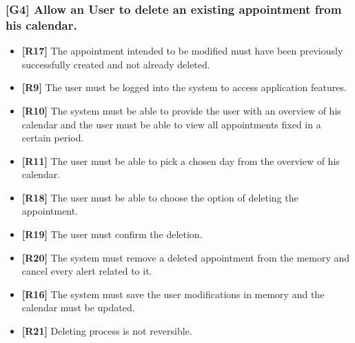\subsubsection{[G4] Allow an User to delete an existing appointment from his calendar.}
\begin{itemize}
	\item \textbf{[R17]} The appointment intended to be modified must have been previously successfully created and not already deleted.
	\item \textbf{[R9]} The user must be logged into the system to access application features.
	\item \textbf{[R10]} The system must be able to provide the user with an overview of his calendar and the user must be able to view all appointments fixed in a certain period.
	\item \textbf{[R11]} The user must be able to pick a chosen day from the overview of his calendar.
	\item \textbf{[R18]} The user must be able to choose the option of deleting the appointment.
	\item \textbf{[R19]} The user must confirm the deletion.
	\item \textbf{[R20]} The system must remove a deleted appointment from the memory and cancel every alert related to it.
	\item \textbf{[R16]} The system must save the user modifications in memory and the calendar must be updated.
	\item \textbf{[R21]} Deleting process is not reversible.
	
\end{itemize}
